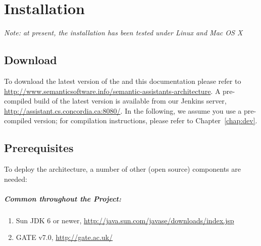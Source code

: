 

   
 

\chapter{Installation}
\label{chap:inst}
\emph{Note: at present, the installation has been tested under
  Linux and Mac OS X}

\section{Download}
To download the latest version of the \sa and this documentation
please refer to
\url{http://www.semanticsoftware.info/semantic-assistants-architecture}.
A pre-compiled build of the latest version is available from our
Jenkins server, \url{http://assistant.cs.concordia.ca:8080/}. In the
following, we assume you use a pre-compiled version; for compilation
instructions, please refer to Chapter~\ref{chap:dev}.

\section{Prerequisites}
To deploy the \sa architecture, a number of other (open source)
components are needed:

\paragraph{Common throughout the Project:}
\begin{enumerate}
  \item  Sun JDK 6 or newer, \url{http://java.sun.com/javase/downloads/index.jsp}
  \item  GATE v7.0, \url{http://gate.ac.uk/}
\end{enumerate} 

